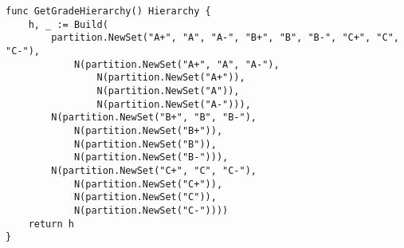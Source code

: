 \begin{lstlisting}[caption=Grade Hierarchy,label=lst:grade_hierarchy]
func GetGradeHierarchy() Hierarchy {
    h, _ := Build(
        partition.NewSet("A+", "A", "A-", "B+", "B", "B-", "C+", "C", "C-"),
            N(partition.NewSet("A+", "A", "A-"),
                N(partition.NewSet("A+")),
                N(partition.NewSet("A")),
                N(partition.NewSet("A-"))),
        N(partition.NewSet("B+", "B", "B-"),
            N(partition.NewSet("B+")),
            N(partition.NewSet("B")),
            N(partition.NewSet("B-"))),
        N(partition.NewSet("C+", "C", "C-"),
            N(partition.NewSet("C+")),
            N(partition.NewSet("C")),
            N(partition.NewSet("C-"))))
    return h
}
\end{lstlisting}